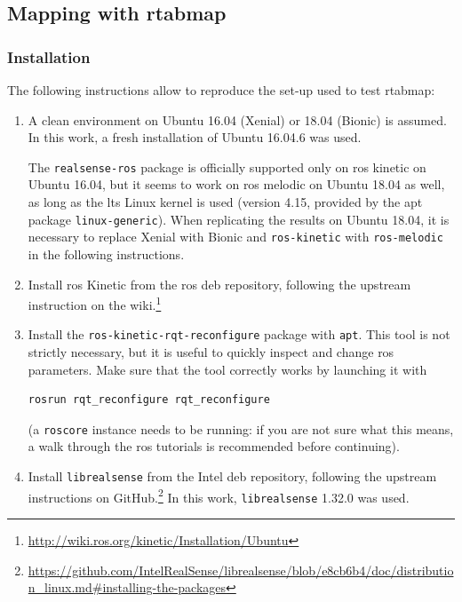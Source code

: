 \documentclass[11pt, letterpaper, twoside]{article}
\begin{document}
\subsection{Mapping with \acs{rtabmap}}\label{sec:rtabmap-setup}

\subsubsection{Installation}

The following instructions allow to reproduce the set-up used to test
\gls{rtabmap}:
\begin{enumerate}

    \item A clean environment on Ubuntu 16.04 (Xenial) or 18.04 (Bionic) is
        assumed. In this work, a fresh installation of Ubuntu 16.04.6 was used.

        The \texttt{realsense-ros} package is officially supported only on
        \gls{ros} kinetic on Ubuntu 16.04, but it seems to work on \gls{ros}
        melodic on Ubuntu 18.04 as well, as long as the \gls{lts} Linux kernel
        is used (version 4.15, provided by the apt package
        \texttt{linux-generic}). When replicating the results on Ubuntu 18.04,
        it is necessary to replace Xenial with Bionic and \texttt{ros-kinetic}
        with \texttt{ros-melodic} in the following instructions.

    \item Install \gls{ros} Kinetic from the \gls{ros} deb repository,
        following the upstream instruction on the
        wiki.\footnote{\url{http://wiki.ros.org/kinetic/Installation/Ubuntu}}

    \item Install the \texttt{ros-kinetic-rqt-reconfigure} package with
        \texttt{apt}. This tool is not strictly necessary, but it is useful to
        quickly inspect and change \gls{ros} parameters. Make sure that the
        tool correctly works by launching it with
\begin{Verbatim}[samepage=true]
    rosrun rqt_reconfigure rqt_reconfigure
\end{Verbatim}
        (a \texttt{roscore} instance needs to be running: if you are not sure
        what this means, a walk through the \gls{ros} tutorials is recommended
        before continuing).

    \item Install \texttt{librealsense} from the Intel deb repository,
        following the upstream instructions on
        GitHub.\footnote{\url{https://github.com/IntelRealSense/librealsense/blob/e8cb6b4/doc/distribution_linux.md\#installing-the-packages}}
        In this work, \texttt{librealsense} 1.32.0 was used.


\end{enumerate}
\end{document}
